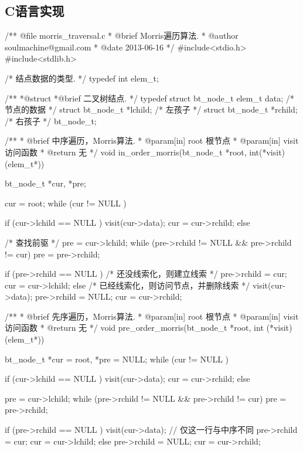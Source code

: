 \subsection{C语言实现}
\label{sec:morrisTraversalImpl}
\begin{Codex}[label=morris_traversal.cpp]
/** @file morris_traversal.c
 * @brief Morris遍历算法.
 * @author soulmachine@gmail.com
 * @date 2013-06-16
 */
#include<stdio.h>
#include<stdlib.h>

/* 结点数据的类型. */
typedef int elem_t;

/**
 *@struct
 *@brief 二叉树结点.
 */
typedef struct bt_node_t {
    elem_t data; /* 节点的数据 */
    struct bt_node_t *lchild; /* 左孩子 */
    struct bt_node_t *rchild; /* 右孩子 */
} bt_node_t;

/**
 * @brief 中序遍历，Morris算法.
 * @param[in] root 根节点
 * @param[in] visit 访问函数
 * @return 无
 */
void in_order_morris(bt_node_t *root, int(*visit)(elem_t*)) {
    bt_node_t *cur, *pre;

    cur = root;
    while (cur != NULL ) {
        if (cur->lchild == NULL ) {
            visit(cur->data);
            cur = cur->rchild;
        } else {
            /* 查找前驱 */
            pre = cur->lchild;
            while (pre->rchild != NULL && pre->rchild != cur)
                pre = pre->rchild;

            if (pre->rchild == NULL ) {    /* 还没线索化，则建立线索 */
                pre->rchild = cur;
                cur = cur->lchild;
            } else {    /* 已经线索化，则访问节点，并删除线索  */
                visit(cur->data);
                pre->rchild = NULL;
                cur = cur->rchild;
            }
        }
    }
}

/**
 * @brief 先序遍历，Morris算法.
 * @param[in] root 根节点
 * @param[in] visit 访问函数
 * @return 无
 */
void pre_order_morris(bt_node_t *root, int (*visit)(elem_t*)) {
    bt_node_t *cur = root, *pre = NULL;
    while (cur != NULL ) {
        if (cur->lchild == NULL ) {
            visit(cur->data);
            cur = cur->rchild;
        } else {
            pre = cur->lchild;
            while (pre->rchild != NULL && pre->rchild != cur)
                pre = pre->rchild;

            if (pre->rchild == NULL ) {
                visit(cur->data);  // 仅这一行与中序不同
                pre->rchild = cur;
                cur = cur->lchild;
            } else {
                pre->rchild = NULL;
                cur = cur->rchild;
            }
        }
    }
}


\end{Codex}
